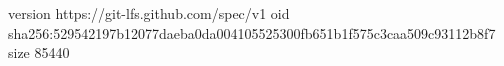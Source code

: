 version https://git-lfs.github.com/spec/v1
oid sha256:529542197b12077daeba0da004105525300fb651b1f575c3caa509c93112b8f7
size 85440
